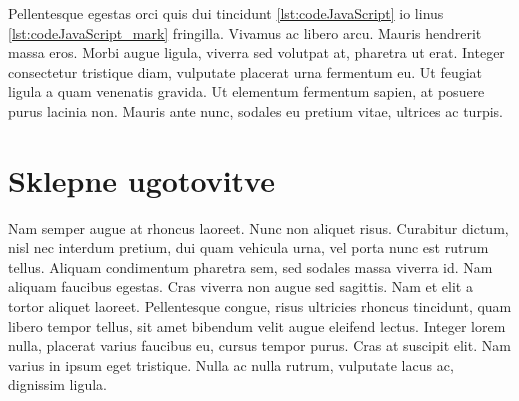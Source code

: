 \documentclass[a4paper, 12pt, twoside]{book}
\begin{document}
Pellentesque egestas orci quis dui tincidunt \ref{lst:codeJavaScript} io linus \ref{lst:codeJavaScript_mark} fringilla. Vivamus ac libero arcu. Mauris hendrerit massa eros. Morbi augue ligula, viverra sed volutpat at, pharetra ut erat. Integer consectetur tristique diam, vulputate placerat urna fermentum eu. Ut feugiat ligula a quam venenatis gravida. Ut elementum fermentum sapien, at posuere purus lacinia non. Mauris ante nunc, sodales eu pretium vitae, ultrices ac turpis.

\chapter{Sklepne ugotovitve}

Nam semper augue at rhoncus laoreet. Nunc non aliquet risus. Curabitur dictum, nisl nec interdum pretium, dui quam vehicula urna, vel porta nunc est rutrum tellus. Aliquam condimentum pharetra sem, sed sodales massa viverra id. Nam aliquam faucibus egestas. Cras viverra non augue sed sagittis. Nam et elit a tortor aliquet laoreet. Pellentesque congue, risus ultricies rhoncus tincidunt, quam libero tempor tellus, sit amet bibendum velit augue eleifend lectus. Integer lorem nulla, placerat varius faucibus eu, cursus tempor purus. Cras at suscipit elit. Nam varius in ipsum eget tristique. Nulla ac nulla rutrum, vulputate lacus ac, dignissim ligula.
\end{document}

